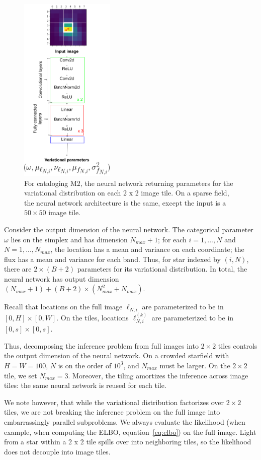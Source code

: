 \begin{figure}[!h]
    \centering
    \includegraphics[width=0.4\textwidth]{figures/starnet_archetecture2.png}
    \vspace{-0.5cm}
    \caption{For cataloging M2, the neural network returning parameters for the variational distribution on each 2 x 2 image tile.
    On a sparse field, the neural network architecture is the same, 
    except the input is a $50 \times 50$ image tile. }
    \label{fig:starnet_arch}
\end{figure}

Consider the output dimension of the neural network. The categorical parameter $\omega$ lies on the 
simplex and has dimension $N_{max} + 1$; for each $i = 1, ..., N$ and $N = 1, ..., N_{max}$, the location has a mean and variance on each coordinate; the flux has a mean and variance for each band. Thus, for star indexed by $(i, N)$, 
there are $2 \times (B + 2)$ parameters for its variational distribution. In total, the neural network has output dimension $(N_{max} + 1) + (B + 2) \times (N_{max}^2 + N_{max})$. 

Recall that locations on the 
full image $\ell_{N, i}$ are parameterized to be in $[0, H] \times [0, W]$. 
On the tiles, locations $\ell^{(k)}_{N, i}$ are parameterized to be in
$[0, s] \times [0, s]$. 

Thus, decomposing the inference problem from full images into $2 \times 2$ tiles controls the output dimension of the neural network. 
On a crowded starfield with $H = W = 100$, $N$ is on the order of $10^3$, 
and $N_{max}$ must be larger. 
On the $2\times 2$ tile, we set $N_{max} = 3$. 
Moreover, the tiling amortizes the inference across image tiles: the same neural network is reused for each tile. 

We note however, that while the variational distribution factorizes over $2 \times 2$ tiles, we are not breaking the inference problem on the full image into embarrassingly parallel subproblems. We always evaluate the likelihood (when example, when computing the ELBO, equation~\eqref{eq:elbo}) on the full image.
Light from a star within a 2 x 2 tile spills over into neighboring tiles, so the likelihood does not decouple into image tiles. 
